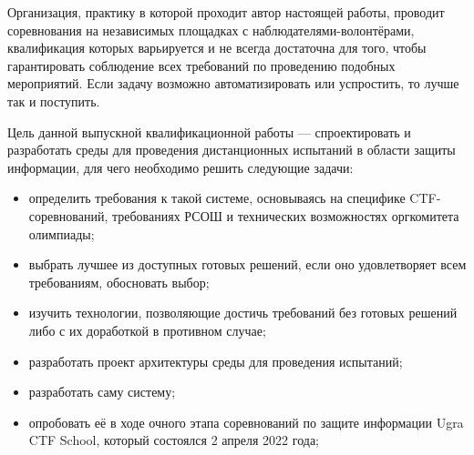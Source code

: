 Организация, практику в которой проходит автор настоящей работы, проводит соревнования на независимых площадках с наблюдателями-волонтёрами, квалификация которых варьируется и не всегда достаточна для того, чтобы гарантировать соблюдение всех требований по проведению подобных мероприятий. Если задачу возможно автоматизировать или успростить, то лучше так и поступить.

Цель данной выпускной квалификационной работы --- спроектировать и разработать среды для проведения дистанционных испытаний в области защиты информации, для чего необходимо решить следующие задачи:
\begin{itemize}
\item определить требования к такой системе, основываясь на специфике CTF-соревнований, требованиях РСОШ и технических возможностях оргкомитета олимпиады;
\item выбрать лучшее из доступных готовых решений, если оно удовлетворяет всем требованиям, обосновать выбор;
\item изучить технологии, позволяющие достичь требований без готовых решений либо с их доработкой в противном случае;
\item разработать проект архитектуры среды для проведения испытаний;
\item разработать саму систему;
\item опробовать её в ходе очного этапа соревнований по защите информации Ugra CTF School, который состоялся 2 апреля 2022 года;
\end{itemize}
